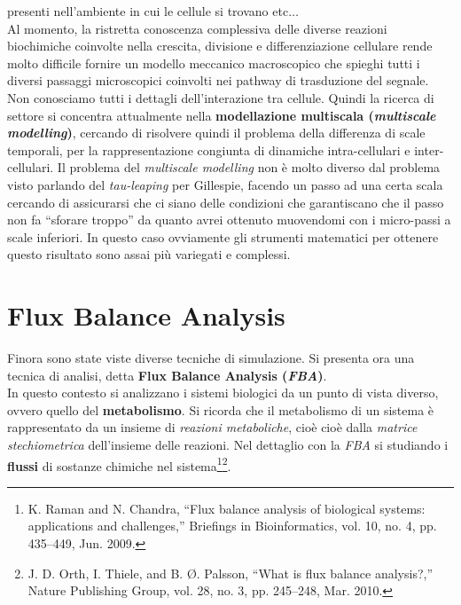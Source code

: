 \documentclass[a4paper,12pt, oneside]{book}
\begin{document}
presenti nell'ambiente in cui le cellule si trovano etc$\ldots$\\
Al momento, la ristretta conoscenza complessiva delle diverse reazioni
biochimiche coinvolte nella crescita, divisione e differenziazione cellulare
rende molto difficile fornire un modello meccanico macroscopico che spieghi
tutti i diversi passaggi microscopici coinvolti nei pathway di trasduzione del
segnale. Non conosciamo tutti i dettagli dell'interazione tra cellule. Quindi la
ricerca di settore si concentra attualmente nella 
\textbf{modellazione multiscala (\textit{multiscale modelling})}, cercando di
risolvere quindi il problema della differenza di scale temporali, per la
rappresentazione congiunta di dinamiche intra-cellulari e inter-cellulari. Il
problema del \textit{multiscale modelling} non è molto diverso dal problema
visto parlando del \textit{tau-leaping} per Gillespie, facendo un passo ad una
certa scala cercando di assicurarsi che ci siano delle condizioni che
garantiscano che il passo non fa ``sforare troppo'' da quanto avrei ottenuto
muovendomi con i micro-passi a scale inferiori. In questo caso ovviamente gli
strumenti matematici per ottenere questo risultato sono assai più variegati e
complessi.
\chapter{Flux Balance Analysis}
Finora sono state viste diverse tecniche di simulazione. Si presenta ora una
tecnica di analisi, detta \textbf{Flux Balance Analysis (\textit{FBA})}.\\
In questo contesto si analizzano i sistemi biologici da un punto di vista
diverso, ovvero quello del \textbf{metabolismo}. Si ricorda che il metabolismo
di un sistema è rappresentato da un insieme di \textit{reazioni
  metaboliche}, cioè cioè dalla\textit{ matrice stechiometrica} dell'insieme
delle reazioni. Nel dettaglio con la \textit{FBA} si studiando i \textbf{flussi}
di sostanze chimiche nel sistema\footnote{K. Raman and N. Chandra, “Flux balance
  analysis of biological systems: applications and challenges,” Briefings in
Bioinformatics, vol. 10, no. 4, pp. 435–449, Jun. 2009.}\footnote{J. D. Orth,
I. Thiele, and B. Ø. Palsson, “What is flux balance analysis?,” Nature
Publishing Group, vol. 28, no. 3, pp. 245–248, Mar. 2010.}.
\end{document}
